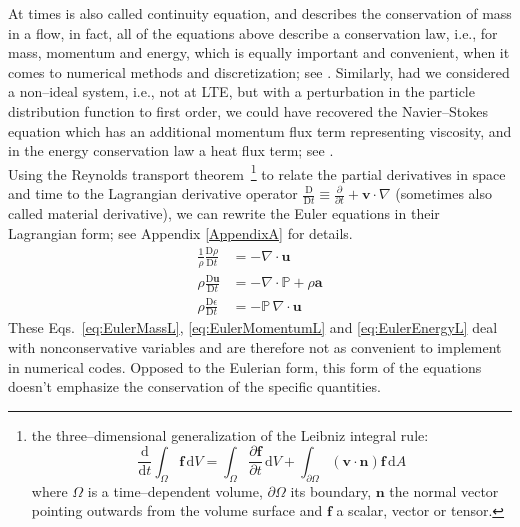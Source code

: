 At times  is also called continuity equation, and describes the conservation of mass in a flow, in fact, all of the equations above describe a conservation law, i.e., for mass, momentum and energy, which is equally important and convenient, when it comes to numerical methods and discretization; see .
Similarly, had we considered a non--ideal system, i.e., not at LTE, but with a perturbation in the particle distribution function to first order, we could have recovered the Navier--Stokes equation which has an additional momentum flux term representing viscosity, and in the energy conservation law a heat flux term; see \citet{Enskog_Chapman}.
\\[6pt]
%
Using the Reynolds transport theorem~\footnote{the three--dimensional generalization of the Leibniz integral rule:
          \begin{equation}
            \frac{\mathrm{d}}{\mathrm{d}t}\int_{\Omega}\textbf{f}\,\mathrm{d}V = \int_{\Omega}\frac{\partial\textbf{f}}{\partial t}\,\mathrm{d}V + \int_{\partial\Omega}(\textbf{v}\cdot\textbf{n})\textbf{f}\,\mathrm{d}A
          \end{equation}
          where $\Omega$ is a time--dependent volume, $\partial\Omega$ its boundary, $\textbf{n}$ the normal vector pointing outwards from the volume surface and $\textbf{f}$ a scalar, vector or tensor.
}
to relate the partial derivatives in space and time to the Lagrangian derivative operator $\frac{\mathrm{D}}{\mathrm{D}t} \equiv \frac{\partial}{\partial t} + \textbf{v} \cdot \nabla$ (sometimes also called material derivative), we can rewrite the Euler equations in their Lagrangian form; see Appendix \ref{AppendixA} for details.
\begin{align}
  \frac{1}{\rho} \frac{\mathrm{D}\rho}{\mathrm{D}t} &= -\nabla \cdot \textbf{u} \label{eq:EulerMassL} \\
  \rho \frac{\mathrm{D}\textbf{u}}{\mathrm{D}t} &= -\nabla \cdot \mathbb{P} + \rho \textbf{a} \label{eq:EulerMomentumL} \\
  \rho \frac{\mathrm{D}\epsilon}{\mathrm{D}t} &= -\mathbb{P}\, \nabla \cdot \textbf{u} \label{eq:EulerEnergyL}
\end{align}
These Eqs.~\eqref{eq:EulerMassL}, \eqref{eq:EulerMomentumL} and \eqref{eq:EulerEnergyL} deal with nonconservative variables and are therefore not as convenient to implement in numerical codes.
Opposed to the Eulerian form, this form of the equations doesn't emphasize the conservation of the specific quantities.
